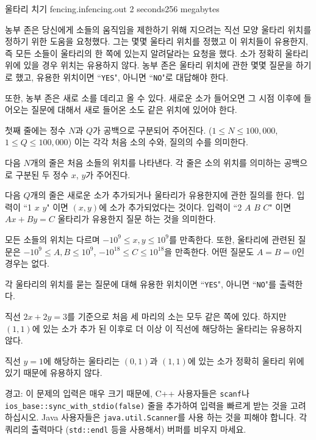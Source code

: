 \begin{problem}{울타리 치기}
	{fencing.in}{fencing.out}
	{2 seconds}{256 megabytes}{}
	
	농부 존은 당신에게 소들의 움직임을 제한하기 위해 지으려는 직선 모양 울타리 위치를 정하기 위한 도움을 요청했다. 그는 몇몇 울타리 위치를 정했고 이 위치들이 유용한지, 즉 모든 소들이 울타리의 한 쪽에 있는지 알려달라는 요청을 했다. 소가 정확히 울타리 위에 있을 경우 위치는 유용하지 않다. 농부 존은 울타리 위치에 관한 몇몇 질문을 하기로 했고, 유용한 위치이면 ``\texttt{YES}", 아니면 ``\texttt{NO}"로 대답해야 한다.
	
	또한, 농부 존은 새로 소를 데리고 올 수 있다. 새로운 소가 들어오면 그 시점 이후에 들어오는 질문에 대해서 새로 들어온 소도 같은 위치에 있어야 한다.

	
	\InputFile
	
	첫째 줄에는 정수 $N$과 $Q$가 공백으로 구분되어 주어진다. ($1 \le N \le 100,000$, $1\le Q \le 100,000$) 이는 각각 처음 소의 수와, 질의의 수를 의미한다.
	
	다음 $N$개의 줄은 처음 소들의 위치를 나타낸다. 각 줄은 소의 위치를 의미하는 공백으로 구분된 두 정수 $x$, $y$가 주어진다.
	
	다음 $Q$개의 줄은 새로운 소가 추가되거나 울타리가 유용한지에 관한 질의를 한다. 입력이 ``1 $x$ $y$" 이면 $(x, y)$에 소가 추가되었다는 것이다. 입력이 ``2 $A$ $B$ $C$" 이면 $Ax+By=C$ 울타리가 유용한지 질문 하는 것을 의미한다.
	
	모든 소들의 위치는 다르며 $-10^9 \le x, y \le 10^9$를 만족한다. 또한, 울타리에 관련된 질문은  $-10^9 \le A, B \le 10^9$, $-10^{18} \le C \le 10^{18}$을 만족한다. 어떤 질문도 $A=B=0$인 경우는 없다.
	
	\OutputFile
	
	각 울타리의 위치를 묻는 질문에 대해 유용한 위치이면 ``\texttt{YES}", 아니면 ``\texttt{NO}"를 출력한다.
	
	\Examples
	
	\begin{example}
	\end{example}

	\Notes
	
	직선 $2x+2y=3$를 기준으로 처음 세 마리의 소는 모두 같은 쪽에 있다. 하지만 $(1, 1)$에 있는 소가 추가 된 이후로 더 이상 이 직선에 해당하는 울타리는 유용하지 않다.
	
	직선 $y=1$에 해당하는 울타리는 $(0, 1)$과 $(1, 1)$에 있는 소가 정확히 울타리 위에 있기 때문에 유용하지 않다.
	
	경고: 이 문제의 입력은 매우 크기 때문에, C++ 사용자들은 \texttt{scanf}나 \texttt{ios\_base::sync\_with\_stdio(false)} 줄을 추가하여 입력을 빠르게 받는 것을 고려하십시오. Java 사용자들은 \texttt{java.util.Scanner}를 사용 하는 것을 피해야 합니다. 각 쿼리의 출력마다  (\texttt{std::endl} 등을 사용해서) 버퍼를 비우지 마세요. 

	
\end{problem}

